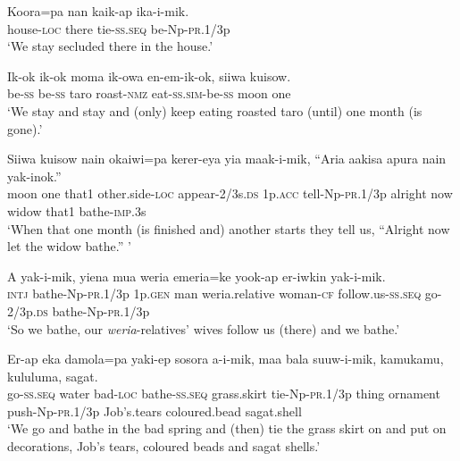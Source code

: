 \ea
\gll  Koora=pa  nan  kaik-ap  ika-i-mik. \\
house-\textsc{loc}  there  tie-\textsc{ss.seq}  be-Np-\textsc{pr}.1/3p \\
\glt ‘We stay secluded there in the house.’ \\
\z


\ea
\gll  Ik-ok  ik-ok  moma  ik-owa  en-em-ik-ok,  siiwa  kuisow. \\
be-\textsc{ss}  be-\textsc{ss}  taro  roast-\textsc{nmz}  eat-\textsc{ss}.\textsc{sim}-be-\textsc{ss}  moon  one \\
\glt ‘We stay and stay and (only) keep eating roasted taro (until) one month (is gone).’ \\
\z


\ea
\gll  Siiwa  kuisow  nain  okaiwi=pa  kerer-eya  yia  maak-i-mik,           “Aria  aakisa  apura  nain  yak-inok.” \\
moon  one  that1  other.side-\textsc{loc}  appear-2/3s.\textsc{ds}  1p.\textsc{acc}  tell-Np-\textsc{pr}.1/3p   alright  now  widow  that1  bathe-\textsc{imp}.3s \\


\glt ‘When that one month (is finished and) another starts they tell us, “Alright now let the widow bathe.” ’ \\
\z


\ea
\gll  A  yak-i-mik,  yiena  mua  weria  emeria=ke             yook-ap  er-iwkin  yak-i-mik. \\
\textsc{intj}  bathe-Np-\textsc{pr}.1/3p  1p.\textsc{gen}  man  weria.relative  woman-\textsc{cf} follow.us-\textsc{ss.seq}  go-2/3p.\textsc{ds}  bathe-Np-\textsc{pr}.1/3p \\


\glt ‘So we bathe, our \textit{weria}{}-relatives’ wives follow us (there) and we bathe.’ \\
\z


\ea
\gll  Er-ap  eka  damola=pa  yaki-ep  sosora  a-i-mik,                maa  bala  suuw-i-mik,  kamukamu,  kululuma,  sagat. \\
go-\textsc{ss.seq}  water  bad-\textsc{loc}  bathe-\textsc{ss.seq}  grass.skirt  tie-Np-\textsc{pr}.1/3p  thing  ornament  push-Np-\textsc{pr}.1/3p  Job’s.tears  coloured.bead  sagat.shell \\


\glt ‘We go and bathe in the bad spring and (then) tie the grass skirt on and put on decorations, Job’s tears, coloured beads and sagat shells.’ \\
\z


